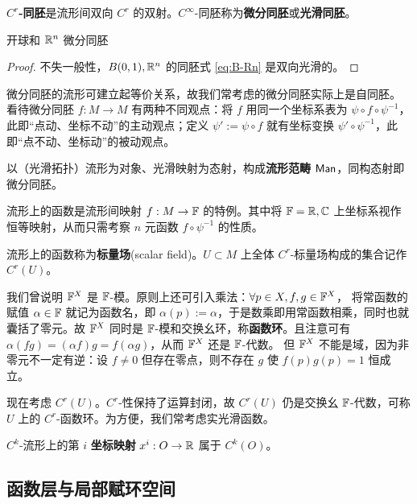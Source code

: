 \begin{definition}
    \textbf{$C^r$-同胚}是流形间双向 $C^r$ 的双射。$C^\infty$-同胚称为\textbf{微分同胚}或\textbf{光滑同胚}。
\end{definition}

\begin{theorem}
    开球和 $\mathbb{R}^n$ 微分同胚
\end{theorem}
\begin{proof}
    不失一般性，$B(0,1),\mathbb{R}^n$ 的同胚式 \eqref{eq:B-Rn} 是双向光滑的。
\end{proof}

微分同胚的流形可建立起等价关系，故我们常考虑的微分同胚实际上是自同胚。
看待微分同胚 $f:M\to M$ 有两种不同观点：将 $f$ 用同一个坐标系表为 $\psi\circ f\circ \psi^{-1}$，此即“点动、坐标不动”的主动观点；定义 $\psi':=\psi\circ f$ 就有坐标变换 $\psi' \circ\psi^{-1}$，此即“点不动、坐标动”的被动观点。

以（光滑拓扑）流形为对象、光滑映射为态射，构成\textbf{流形范畴} $\mathsf{Man}$，同构态射即微分同胚。


\begin{example}
    流形上的函数是流形间映射 $f:M\to\mathbb{F}$ 的特例。其中将 $\mathbb{F}=\mathbb{R},\mathbb{C}$ 上坐标系视作恒等映射，从而只需考察 $n$ 元函数 $f\circ\psi^{-1}$ 的性质。
\end{example}

\begin{definition}
    流形上的函数称为\textbf{标量场}(scalar field)。$U\subset M$ 上全体 $C^r$-标量场构成的集合记作 $C^r(U)$。
\end{definition}

我们曾说明 $\mathbb{F}^X$ 是 $\mathbb{F}$-模。原则上还可引入乘法：$\forall p\in X,f,g\in \mathbb{F}^X$，
将常函数的赋值 $\alpha\in\mathbb{F}$ 就记为函数名，即 $\alpha(p):=\alpha$，于是数乘即用常函数相乘，同时也就囊括了零元。故 $\mathbb{F}^X$ 同时是 $\mathbb{F}$-模和交换幺环，称\textbf{函数环}。且注意可有 $\alpha(fg)=(\alpha f) g=f(\alpha g)$，从而 $\mathbb{F}^X$ 还是 $\mathbb{F}$-代数。
但 $\mathbb{F}^X$ 不能是域，因为非零元不一定有逆：设 $f\ne 0$ 但存在零点，则不存在 $g$ 使 $f(p)g(p)=1$ 恒成立。

现在考虑 $C^r(U)$。$C^r$-性保持了运算封闭，故 $C^r(U)$ 仍是交换幺 $\mathbb{F}$-代数，可称 $U$ 上的 $C^r$-函数环。为方便，我们常考虑实光滑函数。

\begin{example}
    $C^k$-流形上的第 $i$ \textbf{坐标映射} $x^i:O\to\mathbb{R}$ 属于 $C^k(O)$。
\end{example}

\subsection{函数层与局部赋环空间}

